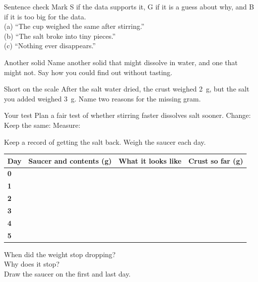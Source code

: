 \begin{puzzle}{Sentence check}
Mark S if the data supports it, G if it is a guess about why, and B if it is too big for the data.\\
(a) ``The cup weighed the same after stirring.'' \wline[1cm]\\
(b) ``The salt broke into tiny pieces.'' \wline[1cm]\\
(c) ``Nothing ever disappears.'' \wline[1cm]
\end{puzzle}

\begin{puzzle}{Another solid}
Name another solid that might dissolve in water, and one that might not. Say how you could find out without tasting. \wline[6cm]
\end{puzzle}

\begin{puzzle}{Short on the scale}
After the salt water dried, the crust weighed 2~g, but the salt you added weighed 3~g. Name two reasons for the missing gram. \wline[6cm]
\end{puzzle}

\begin{puzzle}{Your test}
Plan a fair test of whether stirring faster dissolves salt sooner. Change: \wline[3cm] Keep the same: \wline[4cm] Measure: \wline[3cm]
\end{puzzle}
\clearpage

\thispagestyle{fancy}
Keep a record of getting the salt back. Weigh the saucer each day.\par\medskip
\renewcommand{\arraystretch}{3.0}
\begin{tabularx}{\linewidth}{|>{\sffamily\small\bfseries}p{1.4cm}|X|X|X|}
\hline
Day & Saucer and contents (g) & What it looks like & Crust so far (g) \\ \hline
0 & & & \\ \hline
1 & & & \\ \hline
2 & & & \\ \hline
3 & & & \\ \hline
4 & & & \\ \hline
5 & & & \\ \hline
\end{tabularx}

\vspace{8pt}
When did the weight stop dropping? \wline[6cm]\\[10pt]
Why does it stop? \wline[7cm]\\[10pt]
Draw the saucer on the first and last day.\par\medskip
{}
\clearpage

